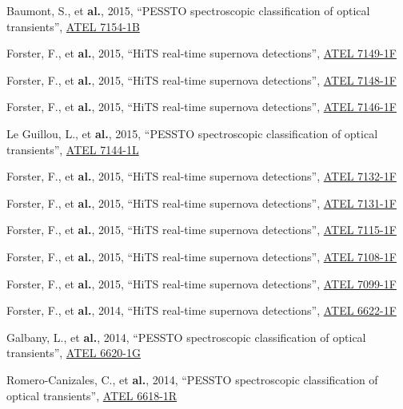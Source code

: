 \documentclass[12pt]{article}
\begin{document}
\begin{bibenum}
    \item Baumont, S., et \textbf{al.}, 2015, ``PESSTO spectroscopic classification of optical transients'', \href{http://adsabs.harvard.edu/abs/2015ATel.7154....1B}{ATEL 7154-1B}
    \item Forster, F., et \textbf{al.}, 2015, ``HiTS real-time supernova detections'', \href{http://adsabs.harvard.edu/abs/2015ATel.7149....1F}{ATEL 7149-1F}
    \item Forster, F., et \textbf{al.}, 2015, ``HiTS real-time supernova detections'', \href{http://adsabs.harvard.edu/abs/2015ATel.7148....1F}{ATEL 7148-1F}
    \item Forster, F., et \textbf{al.}, 2015, ``HiTS real-time supernova detections'', \href{http://adsabs.harvard.edu/abs/2015ATel.7146....1F}{ATEL 7146-1F}
    \item Le Guillou, L., et \textbf{al.}, 2015, ``PESSTO spectroscopic classification of optical transients'', \href{http://adsabs.harvard.edu/abs/2015ATel.7144....1F}{ATEL 7144-1L}
    \item Forster, F., et \textbf{al.}, 2015, ``HiTS real-time supernova detections'', \href{http://adsabs.harvard.edu/abs/2015ATel.7132....1F}{ATEL 7132-1F}
    \item Forster, F., et \textbf{al.}, 2015, ``HiTS real-time supernova detections'', \href{http://adsabs.harvard.edu/abs/2015ATel.7131....1F}{ATEL 7131-1F}
    \item Forster, F., et \textbf{al.}, 2015, ``HiTS real-time supernova detections'', \href{http://adsabs.harvard.edu/abs/2015ATel.7115....1F}{ATEL 7115-1F}
    \item Forster, F., et \textbf{al.}, 2015, ``HiTS real-time supernova detections'', \href{http://adsabs.harvard.edu/abs/2015ATel.7108....1F}{ATEL 7108-1F}
    \item Forster, F., et \textbf{al.}, 2015, ``HiTS real-time supernova detections'', \href{http://adsabs.harvard.edu/abs/2015ATel.7099....1F}{ATEL 7099-1F}
    \item Forster, F., et \textbf{al.}, 2014, ``HiTS real-time supernova detections'', \href{http://adsabs.harvard.edu/abs/2014ATel.6622....1F}{ATEL 6622-1F}
    \item Galbany, L., et \textbf{al.}, 2014, ``PESSTO spectroscopic classification of optical transients'', \href{http://adsabs.harvard.edu/abs/2014ATel.6620....1G}{ATEL 6620-1G}
    \item Romero-Canizales, C., et \textbf{al.}, 2014, ``PESSTO spectroscopic classification of optical transients'', \href{http://adsabs.harvard.edu/abs/2014ATel.6618....1R}{ATEL 6618-1R}

\end{bibenum}
\end{document}
